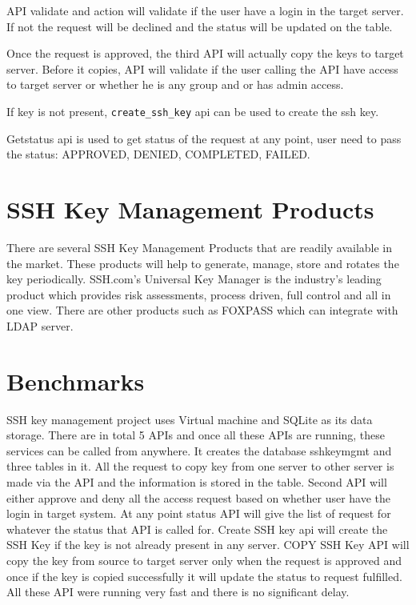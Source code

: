 API validate and action will validate if the user have a 
login in the target server. If not the request will be declined
and the status will be updated on the table.

Once the request is approved, the third API will actually copy
the keys to target server. Before it copies, API will validate
if the user calling the API have access to target server or
whether he is any group and or has admin access. 

If key is not present, \verb|create_ssh_key| api can be used to
create the ssh key.

Getstatus api is used to get status of the request at any point,
user need to pass the status: APPROVED, DENIED, COMPLETED, FAILED.

\section{SSH Key Management Products}

There are several SSH Key Management Products that are readily available
in the market. These products will help to generate, manage, store and
rotates the key periodically. SSH.com's Universal Key Manager is the
industry's leading product which provides risk assessments, process driven,
full control and all in one view. There are other products such as 
FOXPASS which can integrate with LDAP server.

\section{Benchmarks}
SSH key management project uses Virtual machine and SQLite as its 
data storage. There are in total 5 APIs and once all these APIs are
running, these services can be called from anywhere. It creates the 
database sshkeymgmt and three tables in it. All the request to
copy key from one server to other server is made via the API and the 
information is stored in the table. Second API will either approve
and deny all the access request based on whether user have the login
in target system. At any point status API will give the list of request
for whatever the status that API is called for. Create SSH key api will
create the SSH Key if the key is not already present in any server.
COPY SSH Key API will copy the key from source to target server only
when the request is approved and once if the key is copied successfully
it will update the status to request fulfilled.
All these API were running very fast and there is no significant delay. 

